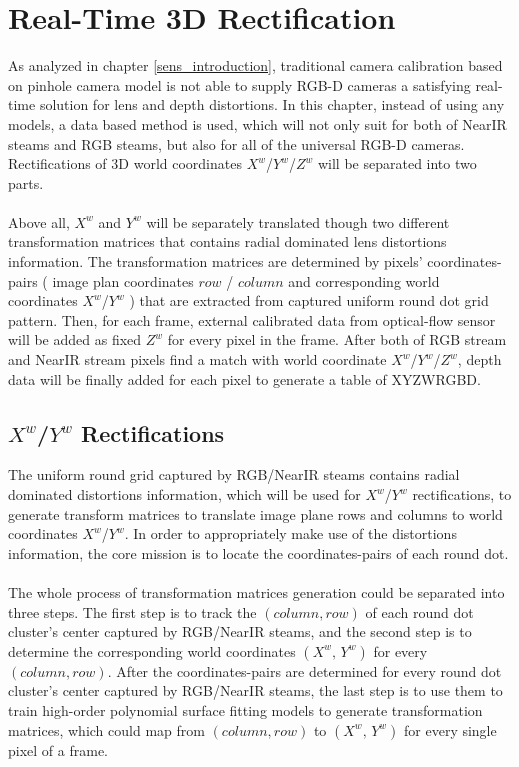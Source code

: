 %
\chapter{Real-Time 3D Rectification} %
\label{sens_Rectification} %
As analyzed in chapter \ref{sens_introduction}, traditional camera calibration based on pinhole camera model is not able to supply RGB-D cameras a satisfying real-time solution for lens and depth distortions. In this chapter, instead of using any models, a data based method is used, which will not only suit for both of NearIR steams and RGB steams, but also for all of the universal RGB-D cameras. Rectifications of 3D world coordinates \(X^{w}\)/\(Y^{w}\)/\(Z^{w}\) will be separated into two parts. 
\\\\%
Above all, \(X^{w}\) and \(Y^{w}\) will be separately translated though two different transformation matrices that contains radial dominated lens distortions information. The transformation matrices are determined by pixels' coordinates-pairs ( image plan coordinates \(row\) / \(column\) and corresponding world coordinates \(X^{w}\)/\(Y^{w}\) ) that are extracted from captured uniform round dot grid pattern. Then, for each frame, external calibrated data from optical-flow sensor will be added as fixed \(Z^{w}\) for every pixel in the frame. After both of RGB stream and NearIR stream pixels find a match with world coordinate \(X^{w}\)/\(Y^{w}\)/\(Z^{w}\), depth data will be finally added for each pixel to generate a table of XYZWRGBD.

\section{\(X^{w}\)/\(Y^{w}\) Rectifications}
The uniform round grid captured by RGB/NearIR steams contains radial dominated distortions information, which will be used for \(X^{w}\)/\(Y^{w}\) rectifications, to generate transform matrices to translate image plane rows and columns to world coordinates \(X^{w}\)/\(Y^{w}\). In order to appropriately make use of the distortions information, the core mission is to locate the coordinates-pairs of each round dot. \\\\
%
The whole process of transformation matrices generation could be separated into three steps. %
The first step is to track the \((column, row)\) of each round dot cluster's center captured by RGB/NearIR steams, and the second step is to determine the corresponding world coordinates \((X^w, \,Y^w)\) for every \((column, row)\). After the coordinates-pairs are determined for every round dot cluster's center captured by RGB/NearIR steams, the last step is to use them to train high-order polynomial surface fitting models to generate transformation matrices, which could map from \((column, row)\) to \((X^w, \,Y^w)\) for every single pixel of a frame.
%
